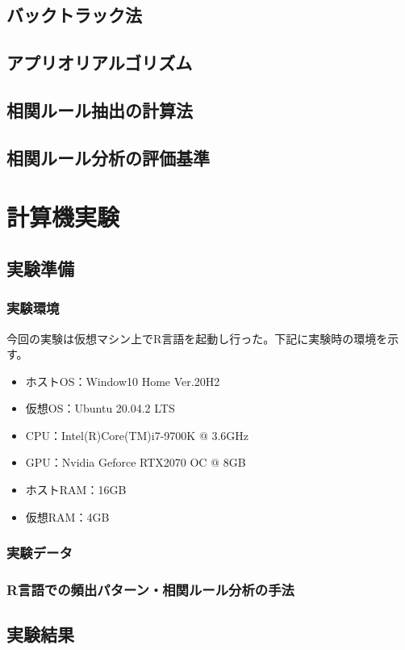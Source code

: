 \documentclass[dvipdfmx]{jsarticle}
\begin{document}
\subsection{バックトラック法}
\subsection{アプリオリアルゴリズム}
\subsection{相関ルール抽出の計算法}
\subsection{相関ルール分析の評価基準}

\section{計算機実験}
\subsection{実験準備}
  \subsubsection{実験環境}
  今回の実験は仮想マシン上でR言語を起動し行った。下記に実験時の環境を示す。
  \begin{itemize}
    \item ホストOS：Window10 Home Ver.20H2
    \item 仮想OS：Ubuntu 20.04.2 LTS
    \item CPU：Intel(R)Core(TM)i7-9700K @ 3.6GHz
    \item GPU：Nvidia Geforce RTX2070 OC @ 8GB
    \item ホストRAM：16GB
    \item 仮想RAM：4GB
  \end{itemize}
\subsubsection{実験データ}
\subsubsection{R言語での頻出パターン・相関ルール分析の手法}
\subsection{実験結果}
\end{document}
